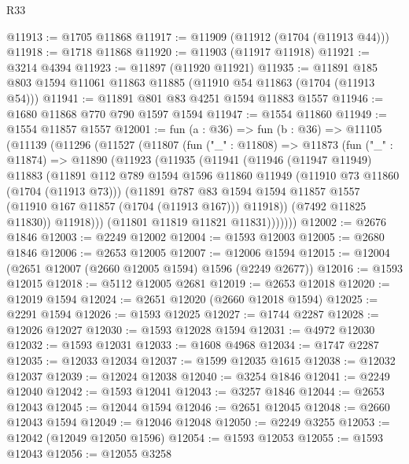 \begin{lexlean}{R33}
\begin{coremodule}
@11913 := @1705 @11868
@11917 := @11909 (@11912 (@1704 (@11913 @44)))
@11918 := @1718 @11868
@11920 := @11903 (@11917 @11918)
@11921 := @3214 @4394
@11923 := @11897 (@11920 @11921)
@11935 := @11891 @185 @803 @1594 @11061 @11863 @11885 (@11910 @54 @11863 (@1704 (@11913 @54)))
@11941 := @11891 @801 @83 @4251 @1594 @11883 @1557
@11946 := @1680 @11868 @770 @790 @1597 @1594
@11947 := @1554 @11860
@11949 := @1554 @11857 @1557
@12001 := fun (a : @36) =>
  fun (b : @36) =>
  @11105
    (@11139
      (@11296
        (@11527
          (@11807
            (fun ("_" : @11808) =>
            @11873
              (fun ("_" : @11874) =>
              @11890
                (@11923
                  (@11935
                    (@11941
                      (@11946
                        (@11947 @11949)
                        @11883
                        (@11891
                          @112
                          @789
                          @1594
                          @1596
                          @11860
                          @11949
                          (@11910 @73 @11860 (@1704 (@11913 @73)))
                          (@11891
                            @787
                            @83
                            @1594
                            @1594
                            @11857
                            @1557
                            (@11910 @167 @11857 (@1704 (@11913 @167)))
                            @11918))
                        (@7492 @11825 @11830))
                      @11918)))
                (@11801 @11819 @11821 @11831)))))))
@12002 := @2676 @1846
@12003 := @2249 @12002
@12004 := @1593 @12003
@12005 := @2680 @1846
@12006 := @2653 @12005
@12007 := @12006 @1594
@12015 := @12004 (@2651 @12007 (@2660 @12005 @1594) @1596 (@2249 @2677))
@12016 := @1593 @12015
@12018 := @5112 @12005 @2681
@12019 := @2653 @12018
@12020 := @12019 @1594
@12024 := @2651 @12020 (@2660 @12018 @1594)
@12025 := @2291 @1594
@12026 := @1593 @12025
@12027 := @1744 @2287
@12028 := @12026 @12027
@12030 := @1593 @12028 @1594
@12031 := @4972 @12030
@12032 := @1593 @12031
@12033 := @1608 @4968
@12034 := @1747 @2287
@12035 := @12033 @12034
@12037 := @1599 @12035 @1615
@12038 := @12032 @12037
@12039 := @12024 @12038
@12040 := @3254 @1846
@12041 := @2249 @12040
@12042 := @1593 @12041
@12043 := @3257 @1846
@12044 := @2653 @12043
@12045 := @12044 @1594
@12046 := @2651 @12045
@12048 := @2660 @12043 @1594
@12049 := @12046 @12048
@12050 := @2249 @3255
@12053 := @12042 (@12049 @12050 @1596)
@12054 := @1593 @12053
@12055 := @1593 @12043
@12056 := @12055 @3258

\end{coremodule}
\end{lexlean}
